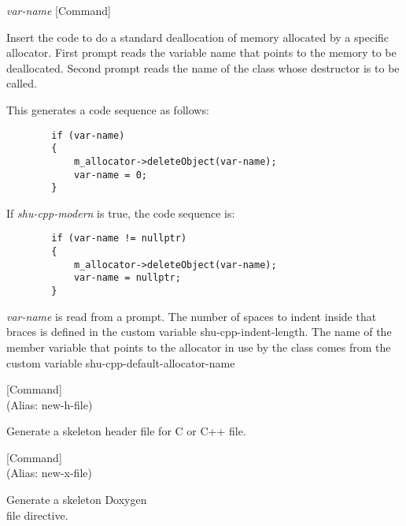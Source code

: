 \vspace{1em}
\noindent
{}
\usebox{\funcname}\emph{var-name}
 \hfill [Command]

\begin{doc-string}
Insert the code to do a standard deallocation of memory allocated by a
specific allocator.  First prompt reads the variable name that points to the
memory to be deallocated.  Second prompt reads the name of the class whose
destructor is to be called.

This generates a code sequence as follows:

\small{\begin{verbatim}
        if (var-name)
        {
            m_allocator->deleteObject(var-name);
            var-name = 0;
        }
\end{verbatim}}

If \emph{shu-cpp-modern} is true, the code sequence is:

\small{\begin{verbatim}
        if (var-name != nullptr)
        {
            m_allocator->deleteObject(var-name);
            var-name = nullptr;
        }
\end{verbatim}}

\emph{var-name} is read from a prompt.  The number of spaces to indent inside that
braces is defined in the custom variable shu-cpp-indent-length.  The name of the
member variable that points to the allocator in use by the class comes from the
custom variable shu-cpp-default-allocator-name
\end{doc-string}

\vspace{1em}
\noindent
{}
\usebox{\funcname}
 \hfill [Command]\\%
 (Alias: new-h-file)

\begin{doc-string}
Generate a skeleton header file for C or C++ file.
\end{doc-string}

\vspace{1em}
\noindent
{}
\usebox{\funcname}
 \hfill [Command]\\%
 (Alias: new-x-file)

\begin{doc-string}
Generate a skeleton Doxygen \\file directive.
\end{doc-string}

